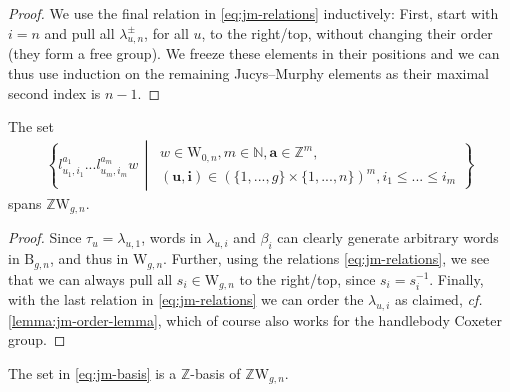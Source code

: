 \documentclass[a4paper,11pt]{amsart}
\newcommand{\cf}{\textsl{cf.}}
\renewcommand{\dots}{\text{...}}
\newcommand{\setstuff}[1]{\mathrm{#1}}
\newcommand{\Z}{\mathbb{Z}}
\newcommand{\N}{\mathbb{N}}
\newcommand{\bsym}[1]{\boldsymbol{#1}}
\numberwithin{equation}{section}
\let\fullref\autoref
\begin{document}
\begin{proof}
We use the final relation in \eqref{eq:jm-relations}
inductively: First, start with $i=n$ and pull 
all $\lambda_{u,n}^{\pm}$, for all $u$, to the right/top, 
without changing their order (they form a free group).
We freeze these elements in their positions and
we can thus use induction 
on the remaining Jucys--Murphy elements 
as their maximal second index is $n-1$.
\end{proof}

\begin{lemma}\label{lemma:jm-elements-span}
The set
\begin{gather}\label{eq:jm-basis}
\left\{ 
l_{u_{1},i_{1}}^{a_{1}}\dots 
l_{u_{m},i_{m}}^{a_{m}}w 
\,\middle\vert\,
\begin{gathered}
w\in\setstuff{W}_{0,n},
m\in\N,
\bsym{a}\in\Z^{m},
\\
(\bsym{u},\bsym{i})\in(\{1,\dots,g\}\times\{1,\dots,n\})^{m},
i_{1}\leq\dots\leq i_{m}
\end{gathered}
\right\}
\end{gather}
spans $\Z\setstuff{W}_{g,n}$.
\end{lemma}

\begin{proof}
Since $\tau_{u}=\lambda_{u,1}$, words in 
$\lambda_{u,i}$ and $\beta_{i}$ can clearly 
generate arbitrary words in $\setstuff{B}_{g,n}$, and thus in 
$\setstuff{W}_{g,n}$.
Further, using the relations \eqref{eq:jm-relations}, 
we see that we can always pull all
$s_{i}\in\setstuff{W}_{g,n}$ to the right/top, since 
$s_{i}=s_{i}^{-1}$. Finally, with the last 
relation in \eqref{eq:jm-relations} we can order the $\lambda_{u,i}$ 
as claimed, {\cf} \fullref{lemma:jm-order-lemma}, which of course 
also works for the handlebody Coxeter group.
\end{proof}

\begin{proposition}\label{proposition:jm-elements-basis}
The set in \eqref{eq:jm-basis}
is a $\Z$-basis of $\Z\setstuff{W}_{g,n}$.
\end{proposition}
\end{document}
